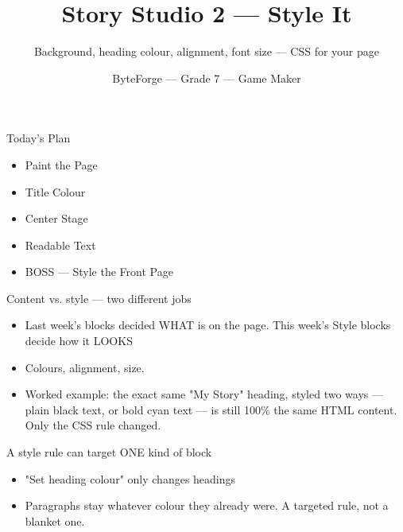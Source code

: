 \documentclass[aspectratio=169]{beamer}
\title{Story Studio 2 — Style It}
\subtitle{Background, heading colour, alignment, font size — CSS for your page}
\author{ByteForge --- Grade 7 --- Game Maker}
\date{}
\begin{document}
\begin{frame}
    \titlepage
\end{frame}

\begin{frame}{Today's Plan}
    \begin{itemize}
        \item Paint the Page
        \item Title Colour
        \item Center Stage
        \item Readable Text
        \item[$\bigstar$] BOSS --- Style the Front Page
    \end{itemize}
\end{frame}

\begin{frame}{Content vs. style — two different jobs}
    \large
    \begin{itemize}
        \item Last week's blocks decided WHAT is on the page. This week's Style blocks decide how it LOOKS
        \item Colours, alignment, size.
        \item Worked example: the exact same "My Story" heading, styled two ways — plain black text, or bold cyan text — is still 100\% the same HTML content. Only the CSS rule changed.
    \end{itemize}

    \begin{center}
    \end{center}
\end{frame}


\begin{frame}{A style rule can target ONE kind of block}
    \large
    \begin{itemize}
        \item "Set heading colour" only changes headings
        \item Paragraphs stay whatever colour they already were. A targeted rule, not a blanket one.
    \end{itemize}
\end{frame}
\end{document}
